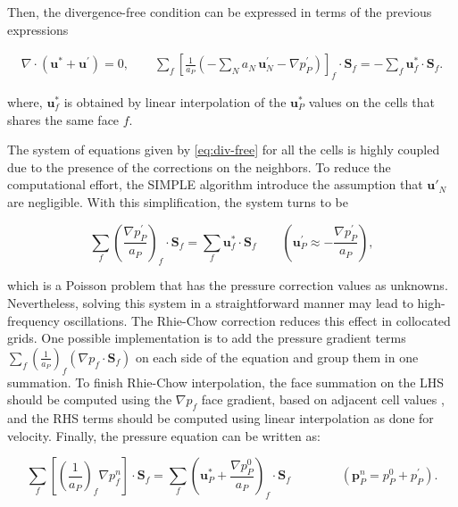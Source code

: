 \documentclass[final,3p,times,10pt,onecolumn]{myElsarticle}
\numberwithin{equation}{section}
\newcommand{\CIP}[1]{{\color{blue} #1}}
\begin{document}
Then, the divergence-free condition can be expressed in terms of the previous expressions

\begin{equation}\label{eq:div-free}
\begin{split}
\nabla \cdot \left(\boldsymbol{u}^{*} + \boldsymbol{u}^{'}\right) = 0 ,\qquad  \sum_f \left[\frac{1}{a_P}\left(-\sum_{N} a_{N}\, \boldsymbol{u}_N^{'} - \nabla p_P^{'}\right)\right]_f\cdot \boldsymbol{S}_f = -\sum_f \boldsymbol{u}_f^{*}\cdot \boldsymbol{S}_f.
\end{split}
\end{equation}

\noindent where, $\boldsymbol{u}^*_f$ is obtained by linear interpolation of the $\boldsymbol{u}^*_{P}$ values on the cells that shares the same face $f$.

The system of equations given by \ref{eq:div-free} for all the cells is highly coupled due to the presence of the corrections on the neighbors. To reduce the computational effort, the SIMPLE algorithm introduce the assumption that $\boldsymbol{u}'_N$ are negligible. With this simplification, the system turns to be

\begin{equation}\label{eq:pEqnSIMPLE1}
\sum_f \left(\frac{\nabla p_P^{'}}{a_P}\right)_f \cdot \boldsymbol{S}_f= \sum_f \boldsymbol{u}_f^{*}\cdot \boldsymbol{S}_f
\qquad
\left(\boldsymbol{u}_P^{'} \approx - \frac{\nabla p_P^{'}}{a_P}\right),
\end{equation}

\noindent which is a Poisson problem that has the pressure correction values as unknowns. \CIP{Nevertheless, solving this system in a straightforward manner may lead to high-frequency oscillations. The Rhie-Chow correction \cite{rhiechow} reduces this effect in collocated grids. One possible implementation is to add the pressure gradient terms $\sum_{f} \left( \frac{1}{a_P}\right)_f \left(\nabla p_f\cdotp \textbf{S}_{f}\right)$ on each side of the equation and group them in one summation. To finish Rhie-Chow interpolation, the face summation on the LHS should be computed using the  $\nabla p_f$ face gradient, based on adjacent cell values \cite{jasak}, and the RHS terms should be computed using linear interpolation as done for velocity.} Finally, the pressure equation can be written as:

\begin{equation}\label{eq:pEqnSIMPLE2}
\sum_f \left[\left(\frac{1}{a_P}\right)_f \nabla p_f^n\right]\cdot \boldsymbol{S}_f = \sum_f \left(\boldsymbol{u}_P^{*} + \frac{\nabla p_P^{0}}{a_P}\right)_f\cdot \boldsymbol{S}_f 
\qquad
\qquad \left(\boldsymbol{p}_P^{n} = p_P^{0} + p_P^{'}\right).
\end{equation}
\end{document}
